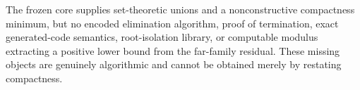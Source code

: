 The frozen core supplies set-theoretic unions and a nonconstructive compactness minimum, but no encoded elimination algorithm, proof of termination, exact generated-code semantics, root-isolation library, or computable modulus extracting a positive lower bound from the far-family residual. These missing objects are genuinely algorithmic and cannot be obtained merely by restating compactness.